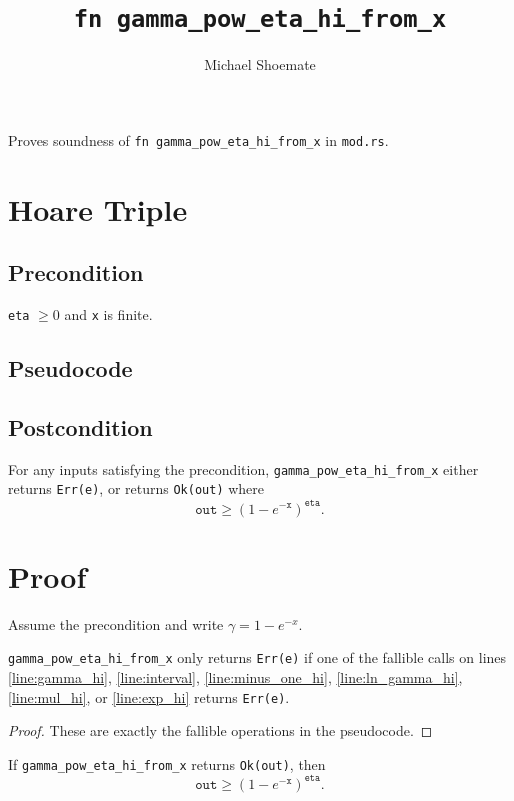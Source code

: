 \documentclass{article}
\title{\texttt{fn gamma\_pow\_eta\_hi\_from\_x}}
\author{Michael Shoemate}
\begin{document}
\maketitle

Proves soundness of \texttt{fn gamma\_pow\_eta\_hi\_from\_x} in \texttt{mod.rs}.

\section{Hoare Triple}
\subsection*{Precondition}
\texttt{eta} $\ge 0$ and \texttt{x} is finite.

\subsection*{Pseudocode}


\subsection*{Postcondition}
\begin{theorem}
\label{postcondition}
For any inputs satisfying the precondition,
\texttt{gamma\_pow\_eta\_hi\_from\_x} either returns \texttt{Err(e)},
or returns \texttt{Ok(out)} where
\[
\texttt{out} \ge (1 - e^{-\texttt{x}})^{\texttt{eta}}.
\]
\end{theorem}

\section{Proof}
Assume the precondition and write $\gamma = 1 - e^{-x}$.

\begin{lemma}
\label{err-e}
\texttt{gamma\_pow\_eta\_hi\_from\_x} only returns \texttt{Err(e)} if one of the fallible calls
on lines \ref{line:gamma_hi}, \ref{line:interval}, \ref{line:minus_one_hi},
\ref{line:ln_gamma_hi}, \ref{line:mul_hi}, or \ref{line:exp_hi} returns \texttt{Err(e)}.
\end{lemma}

\begin{proof}
These are exactly the fallible operations in the pseudocode.
\end{proof}

\begin{lemma}
\label{ok-out}
If \texttt{gamma\_pow\_eta\_hi\_from\_x} returns \texttt{Ok(out)}, then
\[
\texttt{out} \ge (1 - e^{-\texttt{x}})^{\texttt{eta}}.
\]
\end{lemma}
\end{document}

